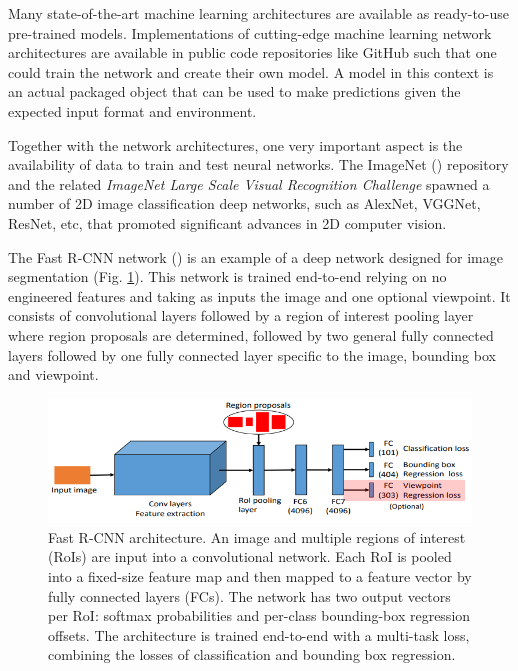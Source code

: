 Many state-of-the-art machine learning architectures are available as ready-to-use pre-trained models. Implementations of cutting-edge machine learning network architectures are available in public code repositories like GitHub such that one could train the network and create their own model. A model in this context is an actual packaged object that can be used to make predictions given the expected input format and environment.

Together with the network architectures, one very important aspect is the availability of data to train and test neural networks.  The ImageNet (\cite{imagenet_cvpr09}) repository and the related \textit{ImageNet Large Scale Visual Recognition Challenge} spawned a number of 2D image classification deep networks, such as AlexNet, VGGNet, ResNet, etc, that promoted significant advances in 2D computer vision. 

The Fast R-CNN network (\cite{girshick2015fast}) is an example of a deep network designed for image segmentation (Fig.  \ref{fig:fast-r-cnn}). This network is trained end-to-end relying on no engineered features and taking as inputs the image and one optional viewpoint. It consists of convolutional layers followed by a region of interest pooling layer where region proposals are determined, followed by two general fully connected layers followed by one fully connected layer specific to the image, bounding box and viewpoint.

\begin{figure}[ht]
 \centering 
 \includegraphics[width=\columnwidth]{figures/Fast-R-CNN-for-object-detection-and-pose-estimation.png}
 \caption{Fast R-CNN architecture. An image and multiple regions of interest (RoIs) are input into a convolutional
network. Each RoI is pooled into a fixed-size feature map and
then mapped to a feature vector by fully connected layers (FCs).
The network has two output vectors per RoI: softmax probabilities
and per-class bounding-box regression offsets. The architecture is
trained end-to-end with a multi-task loss, combining the losses of classification and bounding box regression.}
 \label{fig:fast-r-cnn}
\end{figure}

